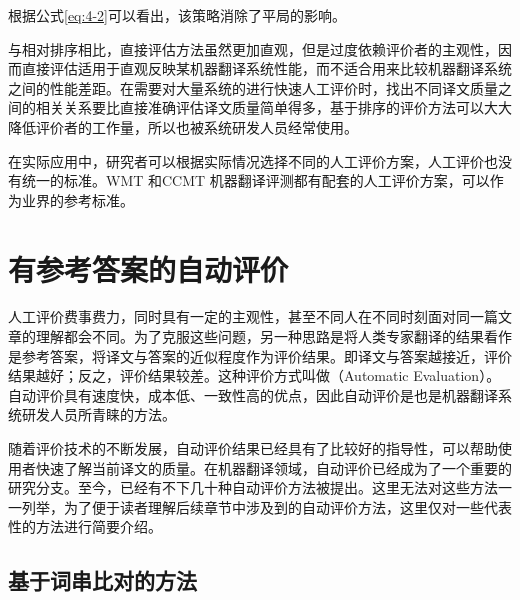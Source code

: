\begin{itemize}
\begin{itemize}
根据公式\eqref{eq:4-2}可以看出，该策略消除了平局的影响。
    \end{itemize}
\vspace{0.5em}
\end{itemize}

\parinterval 与相对排序相比，直接评估方法虽然更加直观，但是过度依赖评价者的主观性，因而直接评估适用于直观反映某机器翻译系统性能，而不适合用来比较机器翻译系统之间的性能差距。在需要对大量系统的进行快速人工评价时，找出不同译文质量之间的相关关系要比直接准确评估译文质量简单得多，基于排序的评价方法可以大大降低评价者的工作量，所以也被系统研发人员经常使用。

\parinterval 在实际应用中，研究者可以根据实际情况选择不同的人工评价方案，人工评价也没有统一的标准。WMT 和CCMT 机器翻译评测都有配套的人工评价方案，可以作为业界的参考标准。

\sectionnewpage
\section{有参考答案的自动评价}\label{Automatic evaluation with reference answers}

\parinterval 人工评价费事费力，同时具有一定的主观性，甚至不同人在不同时刻面对同一篇文章的理解都会不同。为了克服这些问题，另一种思路是将人类专家翻译的结果看作是参考答案，将译文与答案的近似程度作为评价结果。即译文与答案越接近，评价结果越好；反之，评价结果较差。这种评价方式叫做{\small{}}（Automatic Evaluation）。自动评价具有速度快，成本低、一致性高的优点，因此自动评价是也是机器翻译系统研发人员所青睐的方法。

\parinterval 随着评价技术的不断发展，自动评价结果已经具有了比较好的指导性，可以帮助使用者快速了解当前译文的质量。在机器翻译领域，自动评价已经成为了一个重要的研究分支。至今，已经有不下几十种自动评价方法被提出。这里无法对这些方法一一列举，为了便于读者理解后续章节中涉及到的自动评价方法，这里仅对一些代表性的方法进行简要介绍。


\subsection{基于词串比对的方法}

